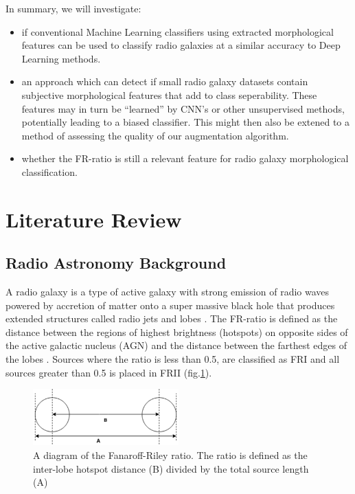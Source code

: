 \documentclass[conference]{IEEEtran}
\begin{document}
In summary, we will investigate:

\begin{itemize}
\item if conventional Machine Learning classifiers using extracted morphological features can be used to classify radio galaxies at a similar accuracy to Deep Learning methods.
\item an approach which can detect if small radio galaxy datasets contain subjective morphological features that add to class seperability. These features may in turn be ``learned'' by CNN's or other unsupervised methods, potentially leading to a biased classifier. This might then also be extened to a method of assessing the quality of our augmentation algorithm.
\item whether the FR-ratio is still a relevant feature for radio galaxy morphological classification.
\end{itemize}

\section{Literature Review}

\subsection{Radio Astronomy Background}

A radio galaxy is a type of active galaxy with strong emission of
radio waves powered by accretion of matter onto a super massive black hole that produces extended structures called radio jets and lobes \cite{wierzbowska_2011}. The FR-ratio is defined as the distance between the regions of highest brightness (hotspots) on opposite sides of the active galactic nucleus (AGN) and the distance between the farthest edges of the lobes \cite{fanaroff_riley_1974}. Sources where the ratio is less than 0.5, are classified as FRI and all sources greater than 0.5 is placed in FRII (fig.\ref{fig:becker2019}). 
\begin{figure}[h]
    \centering
    \includegraphics[width=0.5\textwidth]{EPS/ratio_becker.eps}
    \caption{A diagram of the Fanaroff-Riley ratio. The ratio is defined as the inter-lobe hotspot distance (B) divided by the total source length (A)}
    \label{fig:becker2019}
\end{figure}
\end{document}
